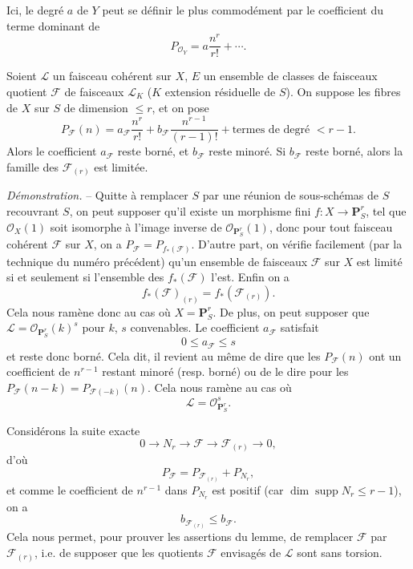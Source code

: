 Ici, le degré $a$ de $Y$ peut se définir le plus commodément par le coefficient
du terme dominant de
\[
P_{\mathcal O_Y}=a\frac{n^r}{r!}+\cdots.
\]

 Soient $\mathcal L$ un faisceau cohérent sur $X$, $E$ un
ensemble de classes de faisceaux quotient $\mathcal F$ de faisceaux
$\mathcal L_K$ ($K$ extension résiduelle de $S$). On suppose les fibres de $X$
sur $S$ de dimension $\leq r$, et on pose
\[
P_{\mathcal F}(n)=a_{\mathcal F}\frac{n^r}{r!}
+b_{\mathcal F}\frac{n^{r-1}}{(r-1)!}
+\text{termes de degré $<r-1$}.
\]
Alors le coefficient $a_{\mathcal F}$ reste borné, et $b_{\mathcal F}$ reste
minoré. Si $b_{\mathcal F}$ reste borné, alors la famille des
$\mathcal F_{(r)}$ est limitée.

\emph{Démonstration.} -- Quitte à remplacer $S$ par une réunion de sous-schémas
de $S$ recouvrant $S$, on peut supposer qu'il existe un morphisme fini
$f:X\longrightarrow\mathbf P^r_S$, tel que $\mathcal O_X(1)$ soit isomorphe à
l'image inverse de $\mathcal O_{\mathbf P^r_S}(1)$, donc pour tout faisceau
cohérent $\mathcal F$ sur $X$, on a
$P_{\mathcal F}=P_{f_*(\mathcal F)}$. D'autre part, on vérifie facilement (par
la technique du numéro précédent) qu'un ensemble de faisceaux $\mathcal F$ sur
$X$ est limité si et seulement si l'ensemble des $f_*(\mathcal F)$ l'est.
Enfin on a
\[
f_*(\mathcal F)_{(r)}=f_*(\mathcal F_{(r)}).
\]
Cela nous ramène donc au cas où $X=\mathbf P^r_S$. De plus, on peut supposer
que $\mathcal L=\mathcal O_{\mathbf P^r_S}(k)^s$ pour $k$, $s$ convenables. Le
coefficient $a_{\mathcal F}$ satisfait
\[
0\leq a_{\mathcal F}\leq s
\]
et reste donc borné. Cela dit, il revient au même de dire que les
$P_{\mathcal F}(n)$ ont un coefficient de $n^{r-1}$ restant minoré (resp.
borné) ou de le dire pour les
$P_{\mathcal F}(n-k)=P_{\mathcal F(-k)}(n)$. Cela nous ramène au cas où
\[
\mathcal L=\mathcal O_{\mathbf P^r_S}^{s}.
\]

Considérons la suite exacte
\[
0\longrightarrow N_r\longrightarrow\mathcal F
\longrightarrow\mathcal F_{(r)}\longrightarrow0,
\]
d'où
\[
P_{\mathcal F}=P_{\mathcal F_{(r)}}+P_{N_r},
\]
et comme le coefficient de $n^{r-1}$ dans $P_{N_r}$ est positif (car
$\dim\operatorname{supp}N_r\leq r-1$), on a
\[
b_{\mathcal F_{(r)}}\leq b_{\mathcal F}.
\]
Cela nous permet, pour prouver les assertions du lemme, de remplacer
$\mathcal F$ par $\mathcal F_{(r)}$, i.e. de supposer que les quotients
$\mathcal F$ envisagés de $\mathcal L$ sont sans torsion.

